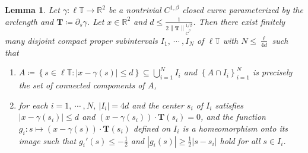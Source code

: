 \documentclass[reqno,centertags,12pt]{amsart}
\newtheorem{lemma}[theorem]{Lemma}
\theoremstyle{definition}
\numberwithin{equation}{section}
\newcommand{\abs}[1]{\left\lvert#1\right\rvert}
\newcommand{\norm}[1]{\left\|#1\right\|}
\newcommand{\set}[1]{\left\{ #1 \right\}}
\newcommand{\setbc}[2]{\left\{ #1\colon#2 \right\}}
\newcommand{\bbR}{{\mathbb{R}}}
\newcommand{\bbT}{{\mathbb{T}}}
\begin{document}
\begin{lemma}\label{L3.2}
    Let $\gamma\colon\ell\bbT\to\bbR^{2}$ be a nontrivial $C^{1,\beta}$ closed curve
    parameterized by the arclength and $\mathbf{T}\coloneqq\partial_{s}\gamma$.
    Let $x\in\bbR^{2}$ and $d\leq\frac{1}{2\norm{\mathbf{T}}_{\dot{C}^{\beta}}^{1/\beta}}$.
    Then there exist finitely many disjoint compact proper subintervals
    $I_{1},\ \cdots\ ,I_{N}$ of $\ell\bbT$ with $N\leq \frac{\ell}{4d}$ such that
    \begin{enumerate}
        \item $A\coloneqq \setbc{s\in\ell\bbT}{\abs{x - \gamma(s)} \leq d}
        \subseteq\bigcup_{i=1}^{N}I_{i}$ and $\set{A\cap I_{i}}_{i=1}^{N}$
        is precisely the set of connected components of $A$,

        \item for each $i=1,\ \cdots\ ,N$, $\abs{I_{i}}=4d$ and the center
        $s_{i}$ of $I_{i}$ satisfies $\abs{x - \gamma(s_{i})} \leq d$ and
        $(x - \gamma(s_{i}))\cdot\mathbf{T}(s_{i}) = 0$, and the function
        $g_{i}\colon s\mapsto (x - \gamma(s))\cdot\mathbf{T}(s_{i})$ defined on $I_{i}$
        is a homeomorphism onto its image such that $g_{i}'(s) \leq -\frac{1}{2}$ and
        $\abs{g_{i}(s)} \geq \frac{1}{2}\abs{s - s_{i}}$ hold for all $s\in I_{i}$.
    \end{enumerate}
\end{lemma}
\end{document}
